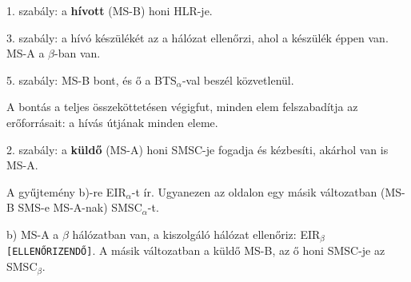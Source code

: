 1. szabály: a \textbf{hívott} (MS-B) honi HLR-je.

\begin{center}\end{center}

3. szabály: a hívó készülékét az a hálózat ellenőrzi, ahol a készülék éppen van. MS-A a $\beta$-ban van.

\begin{center}\end{center}

5. szabály: MS-B bont, és ő a BTS$_\alpha$-val beszél közvetlenül.

\begin{center}\end{center}

A bontás a teljes összeköttetésen végigfut, minden elem felszabadítja az erőforrásait: a hívás útjának minden eleme.

\begin{center}\end{center}

2. szabály: a \textbf{küldő} (MS-A) honi SMSC-je fogadja és kézbesíti, akárhol van is MS-A.

\begin{center}\end{center}
\begin{tipp}
A gyűjtemény b)-re EIR$_\alpha$-t ír. Ugyanezen az oldalon egy másik változatban (MS-B SMS-e MS-A-nak) SMSC$_\alpha$-t.
\end{tipp}
\begin{figyelem}[Javítás]
b) MS-A a $\beta$ hálózatban van, a kiszolgáló hálózat ellenőriz: EIR$_\beta$ \texttt{[ELLENŐRIZENDŐ]}. A másik változatban a küldő MS-B, az ő honi SMSC-je az SMSC$_\beta$.
\end{figyelem}
\begin{eredmeny}

\begin{center}\end{center}
\end{eredmeny}


